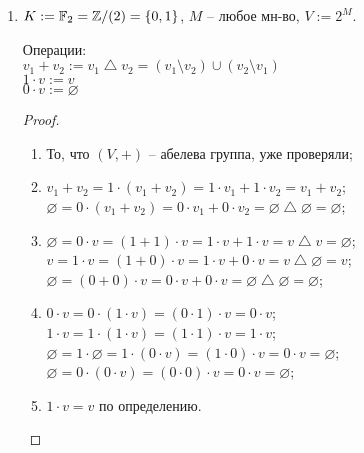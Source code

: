 \begin{enumerate}
    \item $K := \mathbb{F}_2 = \mathbb{Z} / (2) = \{0, 1\}$, $M$ -- 
    любое мн-во, $V := 2^M$.

    Операции:\\
    $v_1 + v_2 := v_1 \bigtriangleup v_2 = (v_1 \setminus v_2) \cup
    (v_2 \setminus v_1)$\\
    $1 \cdot v := v$\\
    $0 \cdot v := \varnothing$

    \begin{proof} $ $

        \begin{enumerate}
            \item То, что $(V, +)$ -- абелева группа, уже проверяли;
            
            \item 
            $v_1 + v_2 = 1 \cdot (v_1 + v_2) = 1 \cdot v_1 +
            1 \cdot v_2 = v_1 + v_2$;\\
            $\varnothing = 0 \cdot (v_1 + v_2) = 0 \cdot v_1 +
            0 \cdot v_2 = \varnothing \bigtriangleup \varnothing =
            \varnothing$;

            \item 
            $\varnothing = 0 \cdot v = (1 + 1) \cdot v =
            1 \cdot v + 1 \cdot v = v \bigtriangleup v = \varnothing$; \\
            $v = 1 \cdot v = (1 + 0) \cdot v = 1 \cdot v + 0 \cdot v =
            v \bigtriangleup \varnothing = v$; \\
            $\varnothing = (0 + 0) \cdot v = 0 \cdot v + 0 \cdot v =
            \varnothing \bigtriangleup \varnothing = \varnothing$;

            \item 
            $0 \cdot v = 0 \cdot (1 \cdot v) = (0 \cdot 1) \cdot v =
            0 \cdot v$; \\
            $1 \cdot v = 1 \cdot (1 \cdot v) = (1 \cdot 1) \cdot v =
            1 \cdot v $; \\
            $\varnothing = 1 \cdot \varnothing = 1 \cdot (0 \cdot v) =
            (1 \cdot 0) \cdot v = 0 \cdot v = \varnothing$; \\
            $\varnothing = 0 \cdot (0 \cdot v) = (0 \cdot 0) \cdot v =
            0 \cdot v = \varnothing$;

            \item $1 \cdot v = v$ по определению.
        \end{enumerate}
    \end{proof}
\end{enumerate}


